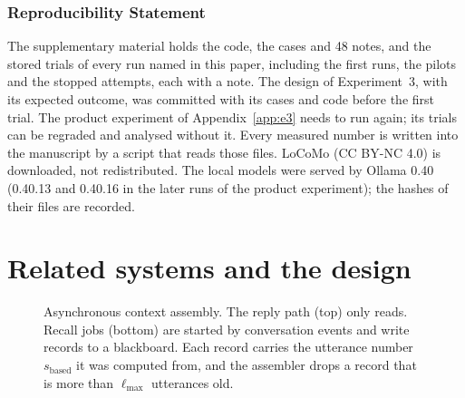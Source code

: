 \documentclass[10pt]{article}
\newcommand{\lmax}{\ell_{\max}}
\begin{document}
\subsubsection*{Reproducibility Statement}
The supplementary material holds the code, the \SCases{} cases and 48 notes, and the stored trials of every run named in this paper, including the first runs, the pilots and the stopped attempts, each with a note. The design of Experiment~3, with its expected outcome, was committed with its cases and code before the first trial. The product experiment of Appendix~\ref{app:e3} needs \product{} to run again; its trials can be regraded and analysed without it. Every measured number is written into the manuscript by a script that reads those files. LoCoMo (CC BY-NC 4.0) is downloaded, not redistributed. The local models were served by Ollama 0.40 (0.40.13 and 0.40.16 in the later runs of the product experiment); the hashes of their files are recorded.




\appendix

\section{Related systems and the design}
\label{app:related}

\begin{figure}[h]
\centering
\architecturefigure
\caption{Asynchronous context assembly. The reply path (top) only reads. Recall jobs (bottom) are started by conversation events and write records to a blackboard. Each record carries the utterance number $s_{\mathrm{based}}$ it was computed from, and the assembler drops a record that is more than $\lmax$ utterances old.}
\label{fig:architecture}
\end{figure}
\end{document}
